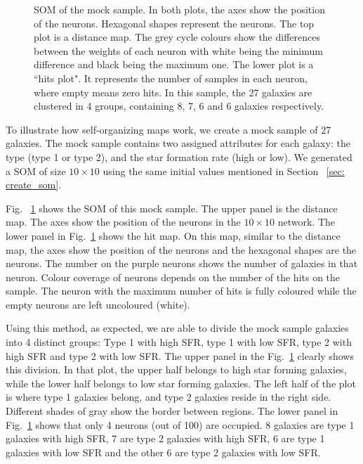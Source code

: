 \begin{figure}
\begin{subfigure}[b]{0.5\textwidth}
            \end{subfigure}
            \caption{SOM of the mock sample. In both plots, the axes show the position of the neurons. Hexagonal shapes represent the neurons. The top plot is a distance map. The grey cycle colours show the differences between the weights of each neuron with white being the minimum difference and black being the maximum one. The lower plot is a ``hits plot". It represents the number of samples in each neuron, where empty means zero hits. In this sample, the 27 galaxies are clustered in 4 groups, containing 8, 7, 6 and 6 galaxies respectively.}
            \label{fig: sample}
        \end{figure}
 
 To illustrate how self-organizing maps work, we create a mock sample of 27 galaxies.
 The mock sample contains two assigned attributes for each galaxy: the type (type 1 or type 2), and the star formation rate (high or low). 
 We generated a SOM of size $10 \times 10$ using the same initial values mentioned in Section ~\ref{sec: create_som}.

 Fig. ~\ref{fig: sample} shows the SOM of this mock sample. 
 The upper panel is the distance map. 
 The axes show the position of the neurons in the $10 \times 10$ network.
 The lower panel in Fig.~\ref{fig: sample} shows the hit map.
 On this map, similar to the distance map, the axes show the position of the neurons and the hexagonal shapes are the neurons.
 The number on the purple neurons shows the number of galaxies in that neuron.
 Colour coverage of neurons depends on the number of the hits on the sample.
 The neuron with the maximum number of hits is fully coloured while the empty neurons are left uncoloured (white). %
 
 
Using this method, as expected, we are able to divide the mock sample galaxies into 4 distinct groups: Type 1 with high SFR, type 1 with low SFR, type 2 with high SFR and type 2 with low SFR. 
The upper panel in the Fig.~\ref{fig: sample} clearly shows this division.
In that plot, the upper half belongs to high star forming galaxies, while the lower half belongs to low star forming galaxies.
The left half of the plot is where type 1 galaxies belong, and type 2 galaxies reside in the right side.
Different shades of gray show the border between regions.
The lower panel in Fig.~\ref{fig: sample} shows that only 4 neurons (out of 100) are occupied. 
8 galaxies are type 1 galaxies with high SFR, 7 are type 2 galaxies with high SFR, 6 are type 1 galaxies with low SFR and the other 6 are type 2 galaxies with low SFR. 

